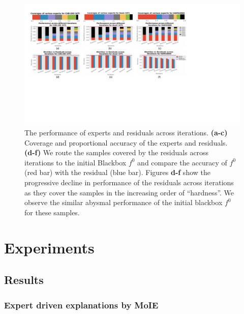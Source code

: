 \documentclass{article}
\theoremstyle{plain}
\theoremstyle{definition}
\theoremstyle{remark}
\begin{document}
\begin{figure}[ht]
\vskip 0.2in
\begin{center}
\centerline{\includegraphics[width=\linewidth]{figures/main/Expert_res_all.pdf}}
\caption{The performance of experts and residuals across iterations. 
\textbf{(a-c)} Coverage and proportional accuracy of the experts and residuals. 
\textbf{(d-f)} We route the samples covered by the residuals across iterations to the initial Blackbox $f^0$ and compare the accuracy of $f^0$ (red bar) with the residual (blue bar). Figures \textbf{d-f} show the progressive decline in performance of the residuals across iterations as they cover the samples in the increasing order of ``hardness''. We observe the similar abysmal performance of the initial blackbox $f^0$ for these samples.
}
\label{fig:expert_performance_cv_vit}
\end{center}
\vskip -0.2in
\end{figure}


\section{Experiments}


\subsection{Results}
% 

\subsubsection{Expert driven explanations by MoIE }

\end{document}
